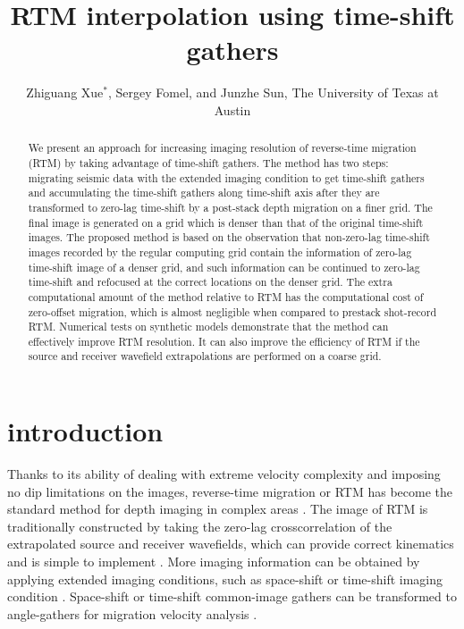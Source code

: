\title{RTM interpolation using time-shift gathers}
\author{Zhiguang Xue$^*$, Sergey Fomel, and Junzhe Sun, The University of Texas at Austin}
\maketitle

\begin{abstract}
We present an approach for increasing imaging resolution of reverse-time migration (RTM) by taking advantage of time-shift gathers.
The method has two steps: migrating seismic data with the extended imaging condition to get time-shift gathers
and accumulating the time-shift gathers along time-shift axis 
after they are transformed to zero-lag time-shift by a post-stack depth migration on a finer grid.
The final image is generated on a grid which is denser than that of the original time-shift images.
The proposed method is based on the observation that non-zero-lag time-shift images recorded by the regular computing grid
contain the information of zero-lag time-shift image of a denser grid, and such information
can be continued to zero-lag time-shift and refocused at the correct locations on the denser grid.
The extra computational amount of the method relative to RTM has the computational cost of zero-offset migration,
which is almost negligible when compared to prestack shot-record RTM.
Numerical tests on synthetic models demonstrate that the method can effectively improve RTM resolution.
It can also improve the efficiency of RTM if the source and receiver wavefield extrapolations are performed on a coarse grid.
\end{abstract}

\section{introduction}
Thanks to its ability of dealing with extreme velocity complexity
and imposing no dip limitations on the images, 
reverse-time migration or RTM \cite[]{baysal83,mcmechan83,whitmore83} 
has become the standard method for depth imaging in complex areas
\cite[]{zhang07,etgen09,zhang11,zhu14b,casasanta15}.
The image of RTM is traditionally constructed by taking the zero-lag crosscorrelation of the extrapolated source and
receiver wavefields, which can provide correct kinematics and is simple to implement \cite[]{claerbout85}.
More imaging information can be obtained by applying extended imaging conditions, such as space-shift or time-shift imaging condition
\cite[]{sava06,sava11}.
Space-shift or time-shift common-image gathers can be transformed to angle-gathers 
for migration velocity analysis \cite[]{sava03,biondi04,fomel11,xu11,tang13}.

